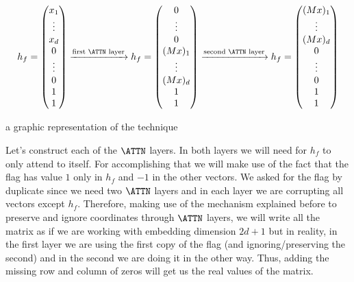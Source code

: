 \[
    h_f = \left( \begin{matrix} x_1    \\ \vdots \\ x_d    \\ 0      \\ \vdots \\ 0      \\ 1 \\ 1 \end{matrix} \right) 
    \xrightarrow{\text{first $\ATTN$ layer}}
    h_f = \left( \begin{matrix} 0      \\ \vdots \\ 0      \\ (Mx)_1 \\ \vdots \\ (Mx)_d \\ 1 \\ 1 \end{matrix} \right)
    \xrightarrow{\text{second $\ATTN$ layer}}
    h_f = \left( \begin{matrix} (Mx)_1 \\ \vdots \\ (Mx)_d \\ 0      \\ \vdots \\ 0      \\ 1 \\ 1 \end{matrix} \right)
\]

{\color{orange} a graphic representation of the technique}

Let's construct each of the $\ATTN$ layers.
In both layers we will need for $h_f$ to only attend to itself.
For accomplishing that we will make use of the fact that the flag has value $1$ only in $h_f$ and $-1$ in the other vectors.
We asked for the flag by duplicate since we need two $\ATTN$ layers and in each layer we are corrupting all vectors except $h_f$.
Therefore, making use of the mechanism explained before to preserve and ignore coordinates through $\ATTN$ layers, we will write all the matrix as if we are working with embedding dimension $2d+1$ but in reality, in the first layer we are using the first copy of the flag (and ignoring/preserving the second) and in the second we are doing it in the other way.
Thus, adding the missing row and column of zeros will get us the real values of the matrix.




